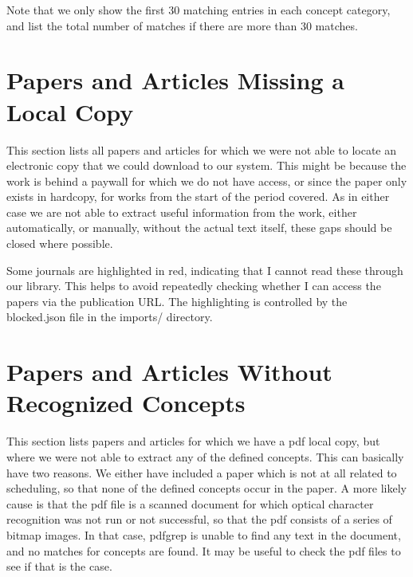 \documentclass[a4paper]{article}
\begin{document}
Note that we only show the first 30 matching entries in each concept category, and list the total number of matches if there are more than 30 matches.





\clearpage
{}
{}





\appendix
\clearpage
\section{Papers and Articles Missing a Local Copy}

This section lists all papers and articles for which we were not able to locate an electronic copy that we could download to our system. This might be because the work is behind a paywall for which we do not have access, or since the paper only exists in hardcopy, for works from the start of the period covered. As in either case we are not able to extract useful information from the work, either automatically, or manually, without the actual text itself, these gaps should be closed where possible.

Some journals are highlighted in red, indicating that I cannot read these through our library. This helps to avoid repeatedly checking whether I can access the papers via the publication URL. The highlighting is controlled by the blocked.json file in the imports/ directory.









\clearpage
\section{Papers and Articles Without Recognized Concepts}

This section lists papers and articles for which we have a pdf local copy, but where we were not able to extract any of the defined concepts. This can basically have two reasons. We either have included a paper which is not at all related to scheduling, so that none of the defined concepts occur in the paper. A  more likely cause is that the pdf file is a scanned document for which optical character recognition was not run or not successful, so that the pdf consists of a series of bitmap images. In that case, pdfgrep is unable to find any text in the document, and no matches for concepts are found. It may be useful to check the pdf files to see if that is the case.
\end{document}
